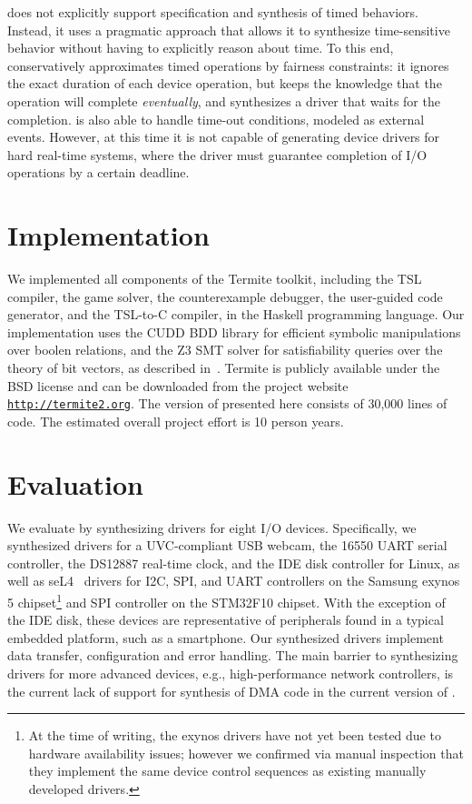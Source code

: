 \termite does not explicitly support specification and synthesis of timed behaviors.  Instead, it uses a pragmatic approach that allows it to synthesize time-sensitive behavior without having to explicitly reason about time.  To this end, \termite conservatively approximates timed operations by fairness constraints: it ignores the exact duration of each device operation, but keeps the knowledge that the operation will complete \emph{eventually}, and synthesizes a driver that waits for the completion.  \termite is also able to handle time-out conditions, modeled as external events.  However, at this time it is not capable of generating device drivers for hard real-time systems, where the driver must guarantee completion of I/O operations by a certain deadline.

\section{Implementation}

We implemented all components of the Termite toolkit, including the TSL compiler, the game solver, the counterexample debugger, the user-guided code generator, and the TSL-to-C compiler, in the Haskell programming language.  Our implementation uses the CUDD BDD library for efficient symbolic manipulations over boolen relations, and the Z3 SMT solver for satisfiability queries over the theory of bit vectors, as described in~\cite{Walker_Ryzhyk_14}.  Termite is publicly available under the BSD license and can be downloaded from the project website \texttt{\url{http://termite2.org}}. The version of \termite presented here consists of 30,000 lines of code.  The estimated overall project effort is 10 person years. 

\section{Evaluation}
\label{s:eval}
We evaluate \termite by synthesizing drivers for eight I/O devices.  Specifically, we synthesized drivers for a UVC-compliant USB webcam, the 16550 UART serial controller, the DS12887 real-time clock, and the IDE disk controller for Linux, as well as seL4~\cite{Klein_EHACDEEKNSTW_09} drivers for I2C, SPI, and UART controllers on the Samsung exynos 5 chipset\footnote{At the time of writing, the exynos drivers have not yet been tested due to hardware availability issues; however we confirmed via manual inspection that they implement the same device control sequences as existing manually developed drivers.} and SPI controller on the STM32F10 chipset.  With the exception of the IDE disk, these devices are representative of peripherals found in a typical embedded platform, such as a smartphone.  Our synthesized drivers implement data transfer, configuration and error handling.  The main barrier to synthesizing drivers for more advanced devices, e.g., high-performance network controllers, is the current lack of support for synthesis of DMA code in the current version of \termite.  

